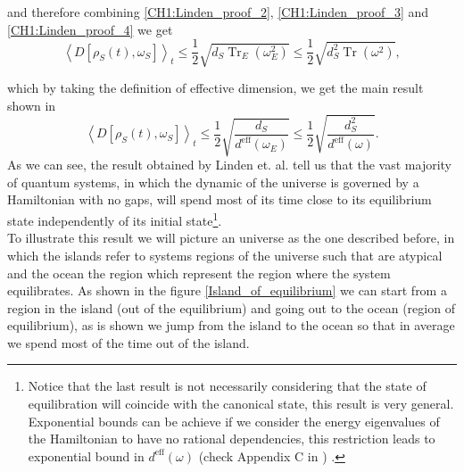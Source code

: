 and therefore combining \eqref{CH1:Linden_proof_2}, \eqref{CH1:Linden_proof_3} and \eqref{CH1:Linden_proof_4} we get
\begin{equation}
\left\langle D\left[\rho_{S}(t), \omega_{S}\right]\right\rangle_{t} \leq \frac{1}{2} \sqrt{d_{S} \operatorname{Tr}_{E}\left(\omega_{E}^{2}\right)} \leq \frac{1}{2} \sqrt{d_{S}^{2} \operatorname{Tr}\left(\omega^{2}\right)},
\label{CH1:Inequality_last}
\end{equation}

which by taking the definition of effective dimension, we get the main result shown in \cite{linden_quantum_2009}
\begin{equation}
\left\langle D\left[\rho_{S}(t), \omega_{S}\right]\right\rangle_{t} \leq \frac{1}{2} \sqrt{\frac{d_{S}}{d^{\mathrm{eff}}\left(\omega_{E}\right)}} \leq \frac{1}{2} \sqrt{\frac{d_{S}^{2}}{d^{\mathrm{eff}}(\omega) }}.
\label{CH1:Result_linden}
\end{equation}
\indent As we can see, the result obtained by Linden et. al. tell us that the vast majority of quantum systems, in which the dynamic of the universe is governed by a Hamiltonian with no gaps, will spend most of its time close to its equilibrium state independently of its initial state\footnote{Notice that the last result is not necessarily considering that the state of equilibration will coincide with the canonical state, this result is very general. Exponential bounds can be achieve if we consider the energy eigenvalues of the Hamiltonian to have no rational dependencies, this restriction leads to exponential bound in $d^{\mathrm{eff}}(\omega)$ (check Appendix C in \cite{linden_quantum_2009}) . }.\\
\indent To illustrate this result we will picture an universe as the one described before, in which the islands refer to systems regions of the universe such that are atypical and the ocean the region which represent the region where the system equilibrates. As shown in the figure 
\ref{Island_of_equilibrium} we can start from a region in the island (out of the equilibrium) and going out to the ocean (region of equilibrium), as is shown we jump from the island to the ocean so that in average we spend most of the time out of the island.\\

